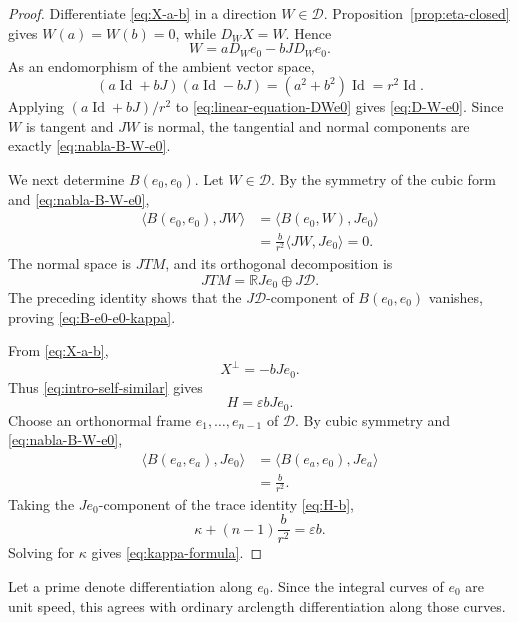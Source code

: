 \documentclass[11pt,a4paper]{article}
\numberwithin{equation}{section}
\newcommand{\R}{\mathbb R}
\newcommand{\Dcal}{\mathcal D}
\newcommand{\Id}{\operatorname{Id}}
\begin{document}
\begin{proof}
Differentiate \eqref{eq:X-a-b} in a direction $W\in\Dcal$.  Proposition~\ref{prop:eta-closed} gives $W(a)=W(b)=0$, while $D_WX=W$.  Hence
\begin{equation}\label{eq:linear-equation-DWe0}
        W=aD_We_0-bJD_We_0.
\end{equation}
As an endomorphism of the ambient vector space,
$$
        (a\Id+bJ)(a\Id-bJ)
        =(a^2+b^2)\Id=r^2\Id.
$$
Applying $(a\Id+bJ)/r^2$ to \eqref{eq:linear-equation-DWe0} gives \eqref{eq:D-W-e0}.  Since $W$ is tangent and $JW$ is normal, the tangential and normal components are exactly \eqref{eq:nabla-B-W-e0}.

We next determine $B(e_0,e_0)$.  Let $W\in\Dcal$.  By the symmetry of the cubic form and \eqref{eq:nabla-B-W-e0},
$$
\begin{aligned}
        \langle B(e_0,e_0),JW\rangle
        &=\langle B(e_0,W),Je_0\rangle\\
        &=\frac{b}{r^2}\langle JW,Je_0\rangle=0.
\end{aligned}
$$
The normal space is $JTM$, and its orthogonal decomposition is
$$
        JTM=\R Je_0\oplus J\Dcal.
$$
The preceding identity shows that the $J\Dcal$-component of $B(e_0,e_0)$ vanishes, proving \eqref{eq:B-e0-e0-kappa}.

From \eqref{eq:X-a-b},
\begin{equation*}
        X^\perp=-bJe_0.
\end{equation*}
Thus \eqref{eq:intro-self-similar} gives
\begin{equation}\label{eq:H-b}
        H=\varepsilon bJe_0.
\end{equation}
Choose an orthonormal frame $e_1,\ldots,e_{n-1}$ of $\Dcal$.  By cubic symmetry and \eqref{eq:nabla-B-W-e0},
$$
\begin{aligned}
        \langle B(e_a,e_a),Je_0\rangle
        &=\langle B(e_a,e_0),Je_a\rangle\\
        &=\frac{b}{r^2}.
\end{aligned}
$$
Taking the $Je_0$-component of the trace identity \eqref{eq:H-b},
$$
        \kappa+(n-1)\frac{b}{r^2}=\varepsilon b.
$$
Solving for $\kappa$ gives \eqref{eq:kappa-formula}.
\end{proof}


Let a prime denote differentiation along $e_0$.  Since the integral curves of $e_0$ are unit speed, this agrees with ordinary arclength differentiation along those curves.
\end{document}
